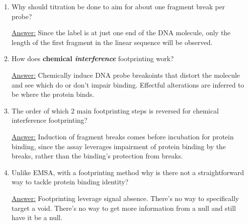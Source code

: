 \documentclass{article}
\newenvironment{QandA}{\begin{enumerate}[label=\bfseries Q\arabic*.]}
                       {\end{enumerate}}
\newenvironment{answered}{\par\normalfont\underline{Answer:}}{}
\begin{document}
\begin{QandA}
    \begin{answered}
    \begin{itemize}
      \item{Label DNA with a radioactivity or with a fluorophore}
      \item{Incubation to allow protein binding}
      \item{Introduction of fragment breaks (nuclease or chemical)}
      \item{Run gel elecrophoresis}
      \item{Infer location of protection from  in the fragment size distribution (where presumably the protein of interest bound)}
    \end{itemize}
    \end{answered}
  \item{Why should titration be done to aim for about one fragment break per probe?}
    \begin{answered}
    Since the label is at just one end of the DNA molecule, only the length of the first fragment in the linear sequence will be observed.
    \end{answered}
  \item{How does \textbf{chemical \textit{interference}} footprinting work?}
    \begin{answered}
    Chemically induce DNA probe breakoints that distort the molecule and see which do or don't impair binding. Effectful alterations are inferred to be where the protein binds.
    \end{answered}
  \item{The order of which 2 main footprinting steps is reversed for chemical interference footprinting?}
    \begin{answered}
    Induction of fragment breaks comes before incubation for protein binding, since the assay leverages impairment of protein binding by the breaks, rather than the binding's protection from breaks.
    \end{answered}
  \item{Unlike EMSA, with a footprinting method why is there not a straightforward way to tackle protein binding identity?}
    \begin{answered}
    Footprinting leverage signal absence. There's no way to specifically target a void. There's no way to get more information from a null and still have it be a null.
    \end{answered}
\end{QandA}
\end{document}
